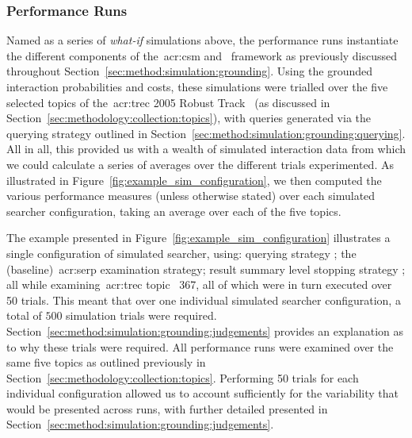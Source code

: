 \subsubsection{Performance Runs}\label{sec:method:simulation:runs:performance}
Named as a series of \emph{what-if} simulations above, the performance runs instantiate the different components of the~\gls{acr:csm} and \simiir~framework as previously discussed throughout Section~\ref{sec:method:simulation:grounding}. Using the grounded interaction probabilities and costs, these simulations were trialled over the five selected topics of the~\gls{acr:trec} 2005 Robust Track~\citep{voorhees2006trec_robust} (as discussed in Section~\ref{sec:methodology:collection:topics}), with queries generated via the querying strategy outlined in Section~\ref{sec:method:simulation:grounding:querying}. All in all, this provided us with a wealth of simulated interaction data from which we could calculate a series of averages over the different trials experimented. As illustrated in Figure~\ref{fig:example_sim_configuration}, we then computed the various performance measures (unless otherwise stated) over each simulated searcher configuration, taking an average over each of the five topics.

The example presented in Figure~\ref{fig:example_sim_configuration} illustrates a single configuration of simulated searcher, using: querying strategy ; the  (baseline)~\gls{acr:serp} examination strategy; result summary level stopping strategy ; all while examining~\gls{acr:trec} topic \textnumero~367, all of which were in turn executed over 50 trials. This meant that over one individual simulated searcher configuration, a total of $500$ simulation trials were required. Section~\ref{sec:method:simulation:grounding:judgements} provides an explanation as to why these trials were required. All performance runs were examined over the same five topics as outlined previously in Section~\ref{sec:methodology:collection:topics}. Performing 50 trials for each individual configuration allowed us to account sufficiently for the variability that would be presented across runs, with further detailed presented in Section~\ref{sec:method:simulation:grounding:judgements}.

